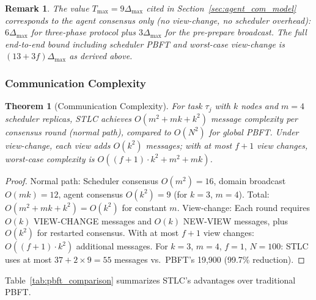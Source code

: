 \documentclass[manuscript,screen,review]{acmart}
\newtheorem{theorem}{Theorem}
\newtheorem{remark}{Remark}
\begin{document}
\begin{remark}
The value $T_{\max} = 9\Delta_{\max}$ cited in Section~\ref{sec:agent_com_model} corresponds to the \emph{agent consensus only} (no view-change, no scheduler overhead): $6\Delta_{\max}$ for three-phase protocol plus $3\Delta_{\max}$ for the pre-prepare broadcast. The full end-to-end bound including scheduler PBFT and worst-case view-change is $(13 + 3f)\Delta_{\max}$ as derived above.
\end{remark}

\subsubsection{Communication Complexity}
\label{sec:complexity_theorem}

\begin{theorem}[Communication Complexity]
\label{thm:complexity}
For task $\tau_j$ with $k$ nodes and $m=4$ scheduler replicas, STLC achieves $O(m^2 + mk + k^2)$ message complexity per consensus round (normal path), compared to $O(N^2)$ for global PBFT. Under view-change, each view adds $O(k^2)$ messages; with at most $f+1$ view changes, worst-case complexity is $O((f+1) \cdot k^2 + m^2 + mk)$.
\end{theorem}

\begin{proof}
Normal path: Scheduler consensus $O(m^2) = 16$, domain broadcast $O(mk) = 12$, agent consensus $O(k^2) = 9$ (for $k=3$, $m=4$). Total: $O(m^2 + mk + k^2) = O(k^2)$ for constant $m$. View-change: Each round requires $O(k)$ VIEW-CHANGE messages and $O(k)$ NEW-VIEW messages, plus $O(k^2)$ for restarted consensus. With at most $f+1$ view changes: $O((f+1) \cdot k^2)$ additional messages. For $k=3$, $m=4$, $f=1$, $N=100$: STLC uses at most $37 + 2 \times 9 = 55$ messages vs.\ PBFT's 19,900 (99.7\% reduction).
\end{proof}

Table~\ref{tab:pbft_comparison} summarizes STLC's advantages over traditional PBFT.
\end{document}
